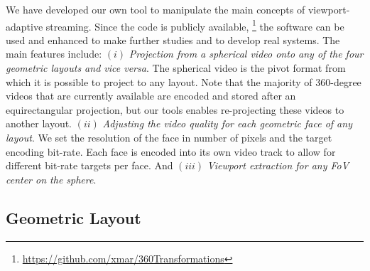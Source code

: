 We have developed our own tool to manipulate the main
concepts of viewport-adaptive streaming. Since the code is publicly
available, \footnote{\url{https://github.com/xmar/360Transformations}}
the software can be used and enhanced to make further studies and to
develop real systems. The main features include: $(i)$
\emph{Projection from a spherical video onto any of the four geometric
layouts and vice versa}. The spherical video is the pivot format from
which it is possible to project to any layout. Note that the majority
of 360-degree videos that are currently available are encoded and
stored after an equirectangular projection, but our tools enables
re-projecting these videos to another layout.  $(ii)$ \emph{Adjusting the video quality for each
geometric face of any layout}. We set the resolution of the face in
number of pixels and the target encoding bit-rate. Each face is
encoded into its own video track to allow for different bit-rate
targets per face. And $(iii)$ \emph{Viewport extraction for any
\ac{FoV} center on the sphere}. 

\subsection{Geometric Layout}

